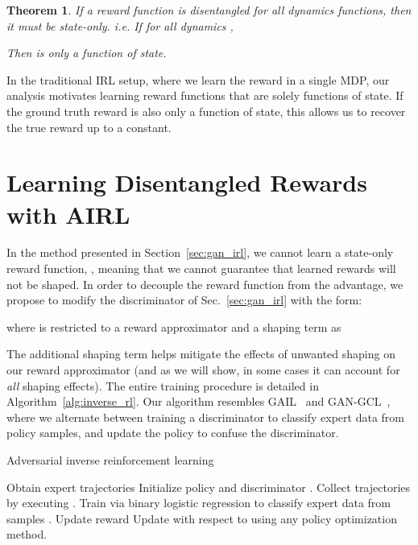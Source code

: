 \documentclass{article} \usepackage{iclr2018_conference,times}
\newtheorem{theorem}{Theorem}[section]
\begin{document}
\begin{theorem}
\label{thm:necc}
If a reward function  is disentangled for all dynamics functions, then it must be state-only. i.e. If for all dynamics ,

Then  is only a function of state.
\end{theorem}

In the traditional IRL setup, where we learn the reward in a single MDP, our analysis motivates learning reward functions that are solely functions of state. If the ground truth reward is also only a function of state, this allows us to recover the true reward up to a constant.
 
\section{Learning Disentangled Rewards with AIRL}
In the method presented in Section~\ref{sec:gan_irl}, we cannot learn a state-only reward function, , meaning that we cannot guarantee that learned rewards will not be shaped. In order to decouple the reward function from the advantage, we propose to modify the discriminator of Sec.~\ref{sec:gan_irl} with the form:

where  is restricted to a reward approximator  and a shaping term  as

The additional shaping term helps mitigate the effects of unwanted shaping on our reward approximator  (and as we will show, in some cases it can account for \textit{all} shaping effects). The entire training procedure is detailed in Algorithm~\ref{alg:inverse_rl}. Our algorithm resembles GAIL~\citep{Ho16b} and GAN-GCL~\citep{Finn16b}, where we alternate between training a discriminator to classify expert data from policy samples, and update the policy to confuse the discriminator.

\begin{algorithm*}[tb]
\caption{Adversarial inverse reinforcement learning}
\label{alg:inverse_rl}
\begin{algorithmic}[1]
    \STATE Obtain expert trajectories 
    \STATE Initialize policy  and discriminator .
        \STATE Collect trajectories  by executing .
        \STATE Train  via binary logistic regression to classify expert data  from samples .
        \STATE Update reward 
        \STATE Update  with respect to  using any policy optimization method.
    \ENDFOR
\end{algorithmic}
\end{algorithm*}
\end{document}

